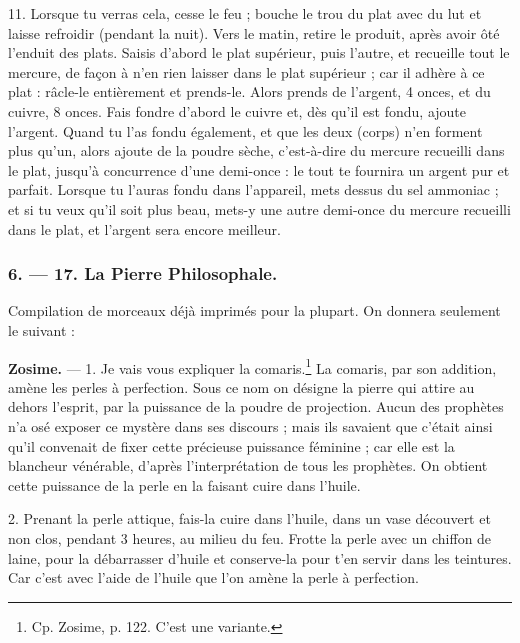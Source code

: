 \documentclass[a4paper, 11pt, oneside, polutonikogreek, french]{article}
\begin{document}
11. Lorsque tu verras cela, cesse le feu ; bouche le trou du plat avec du lut et laisse refroidir (pendant la nuit). Vers le matin, retire le produit, après avoir ôté l'enduit des plats. Saisis d'abord le plat supérieur, puis l'autre, et recueille tout le mercure, de façon à n'en rien laisser dans le plat supérieur ; car il adhère à ce plat : râcle-le entièrement et prends-le. Alors prends de l'argent, 4 onces, et du cuivre, 8 onces. Fais fondre d'abord le cuivre et, dès qu'il est fondu, ajoute l'argent. Quand tu l'as fondu également, et que les deux (corps) n'en forment plus qu'un, alors ajoute de la poudre sèche, c'est-à-dire du mercure recueilli dans le plat, jusqu'à concurrence d'une demi-once : le tout te fournira un argent pur et parfait. Lorsque tu l'auras fondu dans l'appareil, mets dessus du sel ammoniac ; et si tu veux qu'il soit plus beau, mets-y une autre demi-once du mercure recueilli dans le plat, et l'argent sera encore meilleur.

\bigskip
\centerline{\EightStarTaper}
\centerline{\EightStarTaper\EightStarTaper}
\bigskip

\subsubsection{6. --- 17. La Pierre Philosophale.}

Compilation de morceaux déjà imprimés pour la plupart. On donnera seulement le suivant :

\textbf{Zosime.} --- 1. Je vais vous expliquer la comaris.\footnote{Cp. Zosime, p. 122. C'est une variante.} La comaris, par son addition, amène les perles à perfection. Sous ce nom on désigne la pierre qui attire au dehors l'esprit, par la puissance de la poudre de projection. Aucun des prophètes n'a osé exposer ce mystère dans ses discours ; mais ils savaient que c'était ainsi qu'il convenait de fixer cette précieuse puissance féminine ; car elle est la blancheur vénérable, d'après l'interprétation de tous les prophètes. On obtient cette puissance de la perle en la faisant cuire dans l'huile.

2. Prenant la perle attique, fais-la cuire dans l'huile, dans un vase découvert et non clos, pendant 3 heures, au milieu du feu. Frotte la perle avec un chiffon de laine, pour la débarrasser d'huile et conserve-la pour t'en servir dans les teintures. Car c'est avec l'aide de l'huile que l'on amène la perle à perfection.

\bigskip
\centerline{\EightStarTaper}
\centerline{\EightStarTaper\EightStarTaper}
\bigskip
\end{document}
